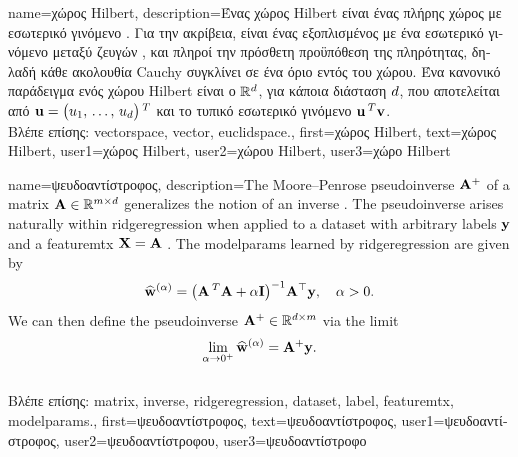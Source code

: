 {name={\foreignlanguage{greek}{χώρος} Hilbert},
	description={\foreignlanguage{greek}{Ένας χώρος} Hilbert \foreignlanguage{greek}{είναι ένας 
		πλήρης χώρος με εσωτερικό γινόμενο} \cite{introhilbertbook}. \foreignlanguage{greek}{Για την ακρίβεια, είναι ένας} 
		\foreignlanguage{greek}{εξοπλισμένος με ένα εσωτερικό γινόμενο μεταξύ ζευγών} , \foreignlanguage{greek}{και πληροί 
		την πρόσθετη προϋπόθεση της πληρότητας, δηλαδή κάθε ακολουθία} Cauchy  \foreignlanguage{greek}{συγκλίνει σε 
		ένα όριο εντός του χώρου. Ένα κανονικό παράδειγμα ενός χώρου} Hilbert \foreignlanguage{greek}{είναι ο}  
		$\mathbb{R}^{d}$, \foreignlanguage{greek}{για κάποια διάσταση $d$, που αποτελείται από}  
		${\bf u} = \big(u_1, \,\ldots, \,u_{d}\big)\,^{T}$ \foreignlanguage{greek}{και το τυπικό εσωτερικό γινόμενο} ${\bf u}\,^{T} {\bf v}$.\\
		\foreignlanguage{greek}{Βλέπε επίσης:} \gls{vectorspace}, \gls{vector}, \gls{euclidspace}.},
	first={\foreignlanguage{greek}{χώρος} Hilbert},
	text={\foreignlanguage{greek}{χώρος} Hilbert},
	user1={\foreignlanguage{greek}{χώρος} Hilbert}, %
	user2={\foreignlanguage{greek}{χώρου} Hilbert}, %
	user3={\foreignlanguage{greek}{χώρο} Hilbert} %
}

{name={\foreignlanguage{greek}{ψευδοαντίστροφος}},
 	description={The Moore–Penrose pseudoinverse ${\bf A}^{+}$ 
 		of a \gls{matrix} ${\bf A} \in \mathbb{R}^{m \times d}$ generalizes the 
		notion of an \gls{inverse} \cite{GolubVanLoanBook}. The pseudoinverse arises naturally 
 		within \gls{ridgeregression} when applied to a \gls{dataset} with arbitrary \gls{label}s ${\bf y}$ 
 		and a \gls{featuremtx} ${\bf X} = {\bf A}$ \cite[Ch.\ 3]{hastie01statisticallearning}. The \glspl{modelparam} 
 		learned by \gls{ridgeregression} are given by
  		\[
  		\widehat{{\bf w}}^{(\alpha)}  = \big({\bf A}\,^{T} {\bf A} + \alpha \mathbf{I} \big)^{-1} {\bf A}^\top {\bf y}, \quad \alpha > 0.
  		\]
  		We can then define the pseudoinverse ${\bf A}^+ \in \mathbb{R}^{d \times m}$ via 
  		the limit \cite[Ch. 3]{benisrael2003generalized}
  		\[
  		\lim_{\alpha \to 0^+} \widehat{{\bf w}}^{(\alpha)} = {\bf A}^+ {\bf y}.
  		\] \\
		\foreignlanguage{greek}{Βλέπε επίσης:} \gls{matrix}, \gls{inverse}, \gls{ridgeregression}, \gls{dataset}, \gls{label}, 
		\gls{featuremtx}, \glspl{modelparam}.},
 	first={\foreignlanguage{greek}{ψευδοαντίστροφος}},
 	text={\foreignlanguage{greek}{ψευδοαντίστροφος}},
	user1={\foreignlanguage{greek}{ψευδοαντίστροφος}}, %
    	user2={\foreignlanguage{greek}{ψευδοαντίστροφου}}, %
	user3={\foreignlanguage{greek}{ψευδοαντίστροφο}} %
 }

